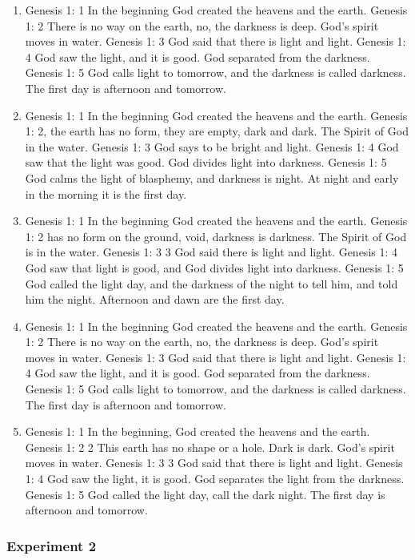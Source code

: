 \documentclass{article}
\begin{document}
\begin{enumerate}
\item 
Genesis 1: 1 In the beginning God created the heavens and the earth.
Genesis 1: 2 There is no way on the earth, no, the darkness is deep. God's spirit moves in water.
Genesis 1: 3 God said that there is light and light.
Genesis 1: 4 God saw the light, and it is good. God separated from the darkness.
Genesis 1: 5 God calls light to tomorrow, and the darkness is called darkness. The first day is afternoon and tomorrow.


\item 
Genesis 1: 1 In the beginning God created the heavens and the earth.
Genesis 1: 2, the earth has no form, they are empty, dark and dark. The Spirit of God in the water.
Genesis 1: 3 God says to be bright and light.
Genesis 1: 4 God saw that the light was good. God divides light into darkness.
Genesis 1: 5 God calms the light of blasphemy, and darkness is night. At night and early in the morning it is the first day.


\item 
Genesis 1: 1 In the beginning God created the heavens and the earth.
Genesis 1: 2 has no form on the ground, void, darkness is darkness. The Spirit of God is in the water.
Genesis 1: 3 3 God said there is light and light.
Genesis 1: 4 God saw that light is good, and God divides light into darkness.
Genesis 1: 5 God called the light day, and the darkness of the night to tell him, and told him the night. Afternoon and dawn are the first day.


\item 
Genesis 1: 1 In the beginning God created the heavens and the earth.
Genesis 1: 2 There is no way on the earth, no, the darkness is deep. God's spirit moves in water.
Genesis 1: 3 God said that there is light and light.
Genesis 1: 4 God saw the light, and it is good. God separated from the darkness.
Genesis 1: 5 God calls light to tomorrow, and the darkness is called darkness. The first day is afternoon and tomorrow.


\item 
Genesis 1: 1 In the beginning, God created the heavens and the earth.
Genesis 1: 2 2 This earth has no shape or a hole. Dark is dark. God's spirit moves in water.
Genesis 1: 3 3 God said that there is light and light.
Genesis 1: 4 God saw the light, it is good. God separates the light from the darkness.
Genesis 1: 5 God called the light day, call the dark night. The first day is afternoon and tomorrow.

\end{enumerate}\subsubsection{Experiment 2}
\end{document}
